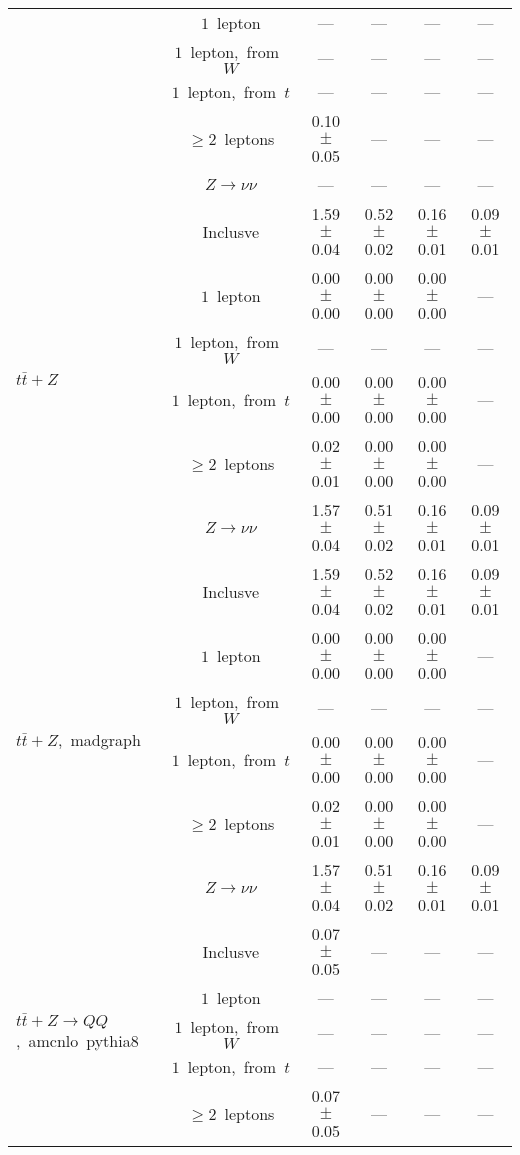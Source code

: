 \documentclass{article}
\begin{document}
\begin{longtable}{|l|c|c|c|c|c|}
 & $1$~lepton  & ---  & ---  & ---  & --- \\* 
 & $1$~lepton,~from~$W$  & ---  & ---  & ---  & --- \\* 
 & $1$~lepton,~from~$t$  & ---  & ---  & ---  & --- \\* 
 & $\ge2$~leptons  & 0.10 $\pm$ 0.05  & ---  & ---  & --- \\* 
 & $Z\rightarrow\nu\nu$  & ---  & ---  & ---  & --- \\* 
\hline 
\multirow{6}{*}{$t\bar{t}+Z$} & Inclusve  & 1.59 $\pm$ 0.04  & 0.52 $\pm$ 0.02  & 0.16 $\pm$ 0.01  & 0.09 $\pm$ 0.01 \\* 
 & $1$~lepton  & 0.00 $\pm$ 0.00  & 0.00 $\pm$ 0.00  & 0.00 $\pm$ 0.00  & --- \\* 
 & $1$~lepton,~from~$W$  & ---  & ---  & ---  & --- \\* 
 & $1$~lepton,~from~$t$  & 0.00 $\pm$ 0.00  & 0.00 $\pm$ 0.00  & 0.00 $\pm$ 0.00  & --- \\* 
 & $\ge2$~leptons  & 0.02 $\pm$ 0.01  & 0.00 $\pm$ 0.00  & 0.00 $\pm$ 0.00  & --- \\* 
 & $Z\rightarrow\nu\nu$  & 1.57 $\pm$ 0.04  & 0.51 $\pm$ 0.02  & 0.16 $\pm$ 0.01  & 0.09 $\pm$ 0.01 \\* 
\hline 
\multirow{6}{*}{$t\bar{t}+Z$,~madgraph} & Inclusve  & 1.59 $\pm$ 0.04  & 0.52 $\pm$ 0.02  & 0.16 $\pm$ 0.01  & 0.09 $\pm$ 0.01 \\* 
 & $1$~lepton  & 0.00 $\pm$ 0.00  & 0.00 $\pm$ 0.00  & 0.00 $\pm$ 0.00  & --- \\* 
 & $1$~lepton,~from~$W$  & ---  & ---  & ---  & --- \\* 
 & $1$~lepton,~from~$t$  & 0.00 $\pm$ 0.00  & 0.00 $\pm$ 0.00  & 0.00 $\pm$ 0.00  & --- \\* 
 & $\ge2$~leptons  & 0.02 $\pm$ 0.01  & 0.00 $\pm$ 0.00  & 0.00 $\pm$ 0.00  & --- \\* 
 & $Z\rightarrow\nu\nu$  & 1.57 $\pm$ 0.04  & 0.51 $\pm$ 0.02  & 0.16 $\pm$ 0.01  & 0.09 $\pm$ 0.01 \\* 
\hline 
\multirow{6}{*}{$t\bar{t}+Z{\rightarrow}QQ$,~amcnlo~pythia8} & Inclusve  & 0.07 $\pm$ 0.05  & ---  & ---  & --- \\* 
 & $1$~lepton  & ---  & ---  & ---  & --- \\* 
 & $1$~lepton,~from~$W$  & ---  & ---  & ---  & --- \\* 
 & $1$~lepton,~from~$t$  & ---  & ---  & ---  & --- \\* 
 & $\ge2$~leptons  & 0.07 $\pm$ 0.05  & ---  & ---  & --- \\* 

\end{longtable}
\end{document}
